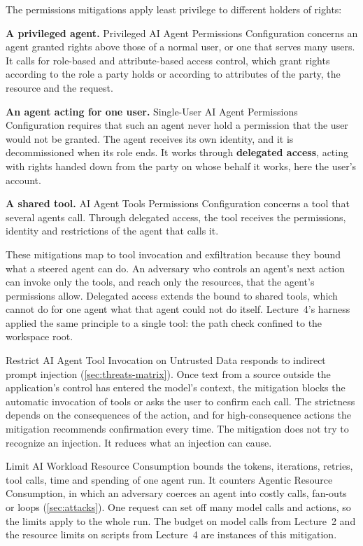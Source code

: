 The permissions mitigations apply least privilege to different holders of rights:
\bi
\item \textbf{A privileged agent.} Privileged AI Agent Permissions Configuration concerns an agent
granted rights above those of a normal user, or one that serves many users. It calls for
role-based and attribute-based access control, which grant rights according to the role a party
holds or according to attributes of the party, the resource and the request.
\item \textbf{An agent acting for one user.} Single-User AI Agent Permissions Configuration requires
that such an agent never hold a permission that the user would not be granted. The agent receives
its own identity, and it is decommissioned when its role ends. It works through \textbf{delegated
access}, acting with rights handed down from the party on whose behalf it works, here the user's
account.
\item \textbf{A shared tool.} AI Agent Tools Permissions Configuration concerns a tool that several
agents call. Through delegated access, the tool receives the permissions, identity and restrictions
of the agent that calls it.
\ei

These mitigations map to tool invocation and exfiltration because they bound what a steered agent
can do. An adversary who controls an agent's next action can invoke only the tools, and reach only
the resources, that the agent's permissions allow. Delegated access extends the bound to shared
tools, which cannot do for one agent what that agent could not do itself. Lecture~4's harness
applied the same principle to a single tool: the path check confined  to the
workspace root.

Restrict AI Agent Tool Invocation on Untrusted Data responds to indirect prompt injection
(\cref{sec:threats-matrix}). Once text from a source outside the application's control has entered
the model's context, the mitigation blocks the automatic invocation of tools or asks the user to
confirm each call. The strictness depends on
the consequences of the action, and for high-consequence actions the mitigation recommends
confirmation every time. The mitigation does not try to recognize an injection. It reduces what an
injection can cause.

Limit AI Workload Resource Consumption bounds the tokens, iterations, retries, tool calls, time and
spending of one agent run. It counters Agentic Resource Consumption, in which an adversary coerces
an agent into costly calls, fan-outs or loops (\cref{sec:attacks}). One request can set off many
model calls and actions, so the limits apply to the whole run. The budget on model calls from
Lecture~2 and the resource limits on scripts from Lecture~4 are instances of this mitigation.

